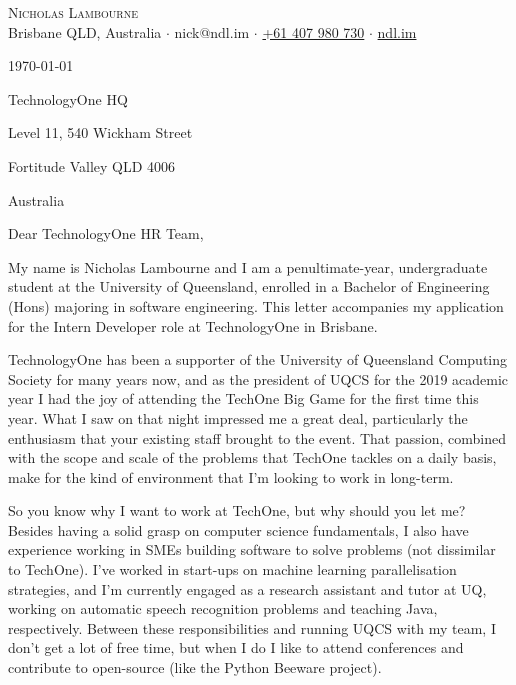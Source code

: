 \documentclass[a4paper]{article}
\begin{document}
\vspace*{-50pt}

\begin{center}
	{\Huge \scshape {Nicholas Lambourne}}\\
	\vspace{3pt}
	Brisbane QLD, Australia $\cdot$ nick@ndl.im $\cdot$ \href{tel:61407980730}{+61 407 980 730} $\cdot$ \href{https://ndl.im}{ndl.im}\\
	\hrulefill
\end{center}

\vspace{5pt}

\today{}

\vspace{30pt}

TechnologyOne HQ

Level 11, 540 Wickham Street

Fortitude Valley QLD 4006

Australia

\vspace{30pt}

Dear TechnologyOne HR Team,

\vspace{30pt}

My name is Nicholas Lambourne and I am a penultimate-year, undergraduate student at the University of Queensland, enrolled in a Bachelor of Engineering (Hons) majoring in software engineering. This letter accompanies my application for the Intern Developer role at TechnologyOne in Brisbane.

\vspace{18pt}

TechnologyOne has been a supporter of the University of Queensland Computing Society for many years now, and as the president of UQCS for the 2019 academic year I had the joy of attending the TechOne Big Game for the first time this year. What I saw on that night impressed me a great deal, particularly the enthusiasm that your existing staff brought to the event. That passion, combined with the scope and scale of the problems that TechOne tackles on a daily basis, make for the kind of environment that I'm looking to work in long-term.

\vspace{18pt}

So you know why I want to work at TechOne, but why should you let me? Besides having a solid grasp on computer science fundamentals, I also have experience working in SMEs building software to solve problems (not dissimilar to TechOne). I've worked in start-ups on machine learning parallelisation strategies, and I'm currently engaged as a research assistant and tutor at UQ, working on automatic speech recognition problems and teaching Java, respectively. Between these responsibilities and running UQCS with my team, I don't get a lot of free time, but when I do I like to attend conferences and contribute to open-source (like the Python Beeware project). 
\end{document}

